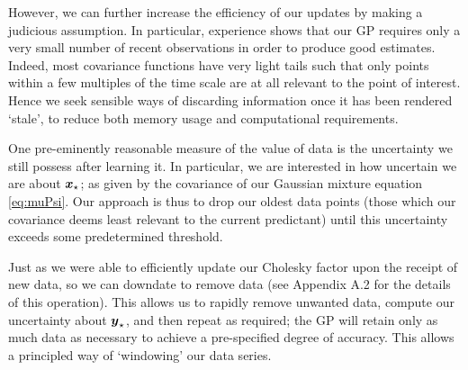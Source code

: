 \documentclass{acmtrans2m}
\begin{document}
However, we can further increase the efficiency of our updates by making a judicious assumption. In particular, experience shows that our GP requires only a very small number of recent observations in order to produce good estimates. Indeed, most covariance functions have very light tails such that only points within a few multiples of the time scale are at all relevant to the point of interest. Hence we seek sensible ways of discarding information once it has been rendered `stale', to reduce both memory usage and computational requirements.

One pre-eminently reasonable measure of the value of data is the uncertainty we still possess after learning it. In particular, we are interested in how uncertain we are about $\boldsymbol{x}_\star$; as given by the covariance of our Gaussian mixture equation \eqref{eq:muPsi}. Our approach is thus to drop our oldest data points (those which our covariance deems least relevant to the current predictant) until this uncertainty exceeds some predetermined threshold. 

Just as we were able to efficiently update our Cholesky factor upon the receipt of new data, so we can downdate to remove data (see Appendix A.2 for the details of this operation). This allows us to rapidly remove unwanted data, compute our uncertainty about $\boldsymbol{y}_\star$, and then repeat as required; the GP will retain only as much data as necessary to achieve a pre-specified degree of accuracy. This allows a principled way of `windowing' our data series.
\end{document}

